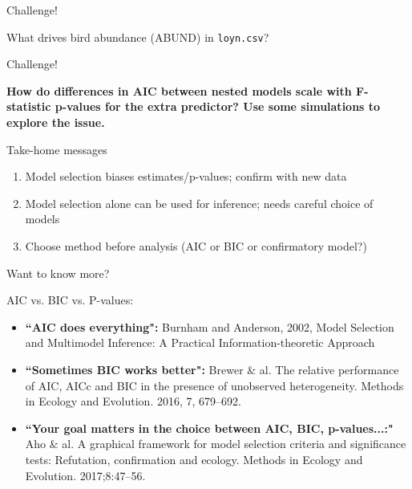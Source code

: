 \documentclass[12pt]{beamer}\usepackage[]{graphicx}\usepackage[]{color}
\begin{document}



\begin{frame}{Challenge!}

What drives bird abundance (ABUND) in \texttt{loyn.csv}?

\end{frame}


\begin{frame}{Challenge!}

\textbf{How do differences in AIC between nested models scale with F-statistic p-values for the extra predictor? Use some simulations to explore the issue.}

\end{frame}

\begin{frame}[standout]{Take-home messages}
\vspace{-0.5cm} \large
\begin{exampleblock}{}
  \begin{enumerate}[<+->] 
    \item Model selection biases estimates/p-values; confirm with new data
    \item Model selection alone can be used for inference; needs careful choice of models
    \item Choose method before analysis (AIC or BIC or confirmatory model?)
  \end{enumerate}
\end{exampleblock}

\end{frame}

\begin{frame}{Want to know more?}

\begin{alertblock}{AIC vs. BIC vs. P-values:}
\begin{itemize}
  \item \textbf{``AIC does everything": }Burnham and Anderson, 2002, Model Selection and Multimodel Inference: A Practical Information-theoretic Approach
  \item \textbf{``Sometimes BIC works better":} Brewer \& al. The relative performance of AIC, AICc and BIC in the presence of unobserved heterogeneity. Methods in Ecology and Evolution. 2016, 7, 679–692.
  \item \textbf{``Your goal matters in the choice between AIC, BIC, p-values...:"} Aho \& al. A graphical framework for model selection criteria and significance tests: Refutation, confirmation and ecology. Methods in Ecology and Evolution. 2017;8:47–56.
\end{itemize}
\end{alertblock}

\end{frame}
\end{document}
